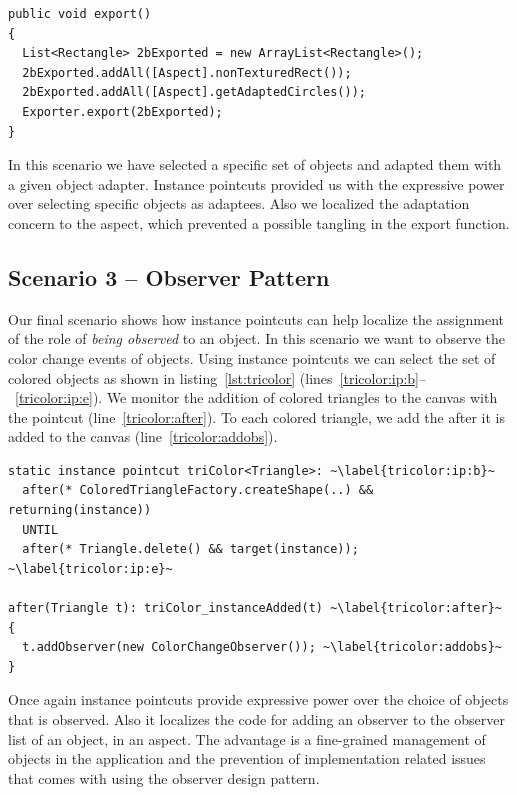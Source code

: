 \begin{lstlisting}[float,  caption={The export function}, label={lst:export}]
public void export()
{
  List<Rectangle> 2bExported = new ArrayList<Rectangle>();
  2bExported.addAll([Aspect].nonTexturedRect());
  2bExported.addAll([Aspect].getAdaptedCircles());
  Exporter.export(2bExported);
}
\end{lstlisting}

In this scenario we have selected a specific set of objects and adapted them with a given object adapter.
Instance pointcuts provided us with the expressive power over selecting specific objects as adaptees.
Also we localized the adaptation concern to the aspect, which prevented a possible tangling in the export function.


\subsection{Scenario 3 -- Observer Pattern}
Our final scenario shows how instance pointcuts can help localize the assignment of the role of \emph{being observed} to an object.
In this scenario we want to observe the color change events of  objects.
Using instance pointcuts we can select the set of colored  objects as shown in listing~\ref{lst:tricolor} (lines~\ref{tricolor:ip:b}--~\ref{tricolor:ip:e}).
We monitor the addition of colored triangles to the canvas with the  pointcut (line~\ref{tricolor:after}). 
To each colored triangle, we add the  after it is added to the canvas (line~\ref{tricolor:addobs}).


\begin{lstlisting}[float, label={lst:tricolor}, caption={An instance pointcut that keeps track of colored \lstinln{Triangle} objects}]
static instance pointcut triColor<Triangle>: ~\label{tricolor:ip:b}~
  after(* ColoredTriangleFactory.createShape(..) && returning(instance))
  UNTIL
  after(* Triangle.delete() && target(instance));  ~\label{tricolor:ip:e}~
  
after(Triangle t): triColor_instanceAdded(t) ~\label{tricolor:after}~
{
  t.addObserver(new ColorChangeObserver()); ~\label{tricolor:addobs}~
}
\end{lstlisting}

Once again instance pointcuts provide expressive power over the choice of objects that is observed.
Also it localizes the code for adding an observer to the observer list of an object, in an aspect. 
The advantage is a fine-grained management of objects in the application and the prevention of implementation related issues that comes with using the observer design pattern.











